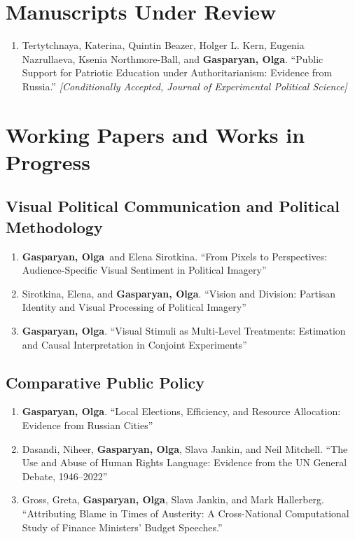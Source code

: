 \documentclass[10pt]{article}
\newcommand{\me}{\textbf{Gasparyan, Olga}}
\newcommand{\status}[1]{ {\small\textit{[#1]}}}
\begin{document}
\section{Manuscripts Under Review}
\begin{enumerate}
    \item Tertytchnaya, Katerina, Quintin Beazer, Holger L. Kern, Eugenia Nazrullaeva, Ksenia Northmore-Ball, and \me. ``Public Support for Patriotic Education under Authoritarianism: Evidence from Russia.'' \status{Conditionally Accepted, \textit{Journal of Experimental Political Science}}
\end{enumerate}

\section{Working Papers and Works in Progress}

\subsection{Visual Political Communication and Political Methodology}
\begin{enumerate}
    \item \me\ and Elena Sirotkina. ``From Pixels to Perspectives: Audience-Specific Visual Sentiment in Political Imagery'' 

    \item Sirotkina, Elena, and \me. ``Vision and Division: Partisan Identity and Visual Processing of Political Imagery'' 


    \item \me. ``Visual Stimuli as Multi-Level Treatments: Estimation and Causal Interpretation in Conjoint Experiments''
\end{enumerate}

\subsection{Comparative Public Policy}
\begin{enumerate}
    \item \me. ``Local Elections, Efficiency, and Resource Allocation: Evidence from Russian Cities''

    \item Dasandi, Niheer, \me, Slava Jankin, and Neil Mitchell. ``The Use and Abuse of Human Rights Language: Evidence from the UN General Debate, 1946--2022''

    \item Gross, Greta, \me, Slava Jankin, and Mark Hallerberg. ``Attributing Blame in Times of Austerity: A Cross-National Computational Study of Finance Ministers' Budget Speeches.''
\end{enumerate}
\end{document}
